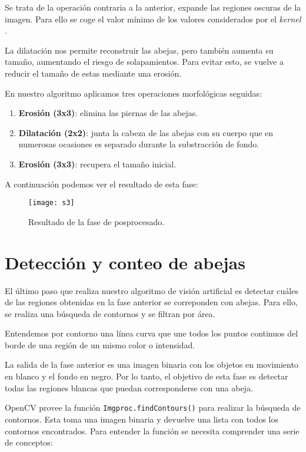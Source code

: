 Se trata de la operación contraria a la anterior, expande las regiones
oscuras de la imagen. Para ello se coge el valor mínimo de los valores
considerados por el \emph{kernel} \citep{book:mastering_opencv}.

La dilatación nos permite reconstruir las abejas, pero también aumenta
su tamaño, aumentando el riesgo de solapamientos. Para evitar esto, se
vuelve a reducir el tamaño de estas mediante una erosión.

En nuestro algoritmo aplicamos tres operaciones morfológicas seguidas:

\begin{enumerate}
\def\labelenumi{\arabic{enumi}.}
\tightlist
\item
  \textbf{Erosión (3x3)}: elimina las piernas de las abejas.
\item
  \textbf{Dilatación (2x2)}: junta la cabeza de las abejas con su cuerpo
  que en numerosas ocasiones es separado durante la substracción de
  fondo.
\item
  \textbf{Erosión (3x3)}: recupera el tamaño inicial.
\end{enumerate}

A continuación podemos ver el resultado de esta fase:

\begin{figure}[H]
	\centering
	\texttt{[image: s3]}
	\caption{Resultado de la fase de posprocesado.}
	\label{fig:s3}
\end{figure}

\section{Detección y conteo de abejas}\label{deteccion-y-conteo-de-abejas}

El último paso que realiza nuestro algoritmo de visión artificial es
detectar cuáles de las regiones obtenidas en la fase anterior se
correponden con abejas. Para ello, se realiza una búsqueda de contornos
y se filtran por área.

Entendemos por contorno una línea curva que une todos los puntos
continuos del borde de una región de un mismo color o intensidad.

La salida de la fase anterior es una imagen binaria con los objetos en
movimiento en blanco y el fondo en negro. Por lo tanto, el objetivo de
esta fase es detectar todas las regiones blancas que puedan
corresponderse con una abeja.

OpenCV provee la función \texttt{Imgproc.findContours()} para realizar
la búsqueda de contornos. Esta toma una imagen binaria y devuelve una
lista con todos los contornos encontrados. Para entender la función se
necesita comprender una serie de conceptos: \citep{opencv:contours}

